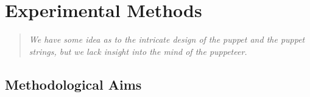 \documentclass[../main.tex]{subfiles}
\begin{document}
\chapter{Experimental Methods}\label{chap:methods}

\bigskip
\begin{quote}
    \emph{We have some idea as to the intricate design of the puppet and the puppet strings, but we lack insight into the mind of the puppeteer\cite{bizziHardScientificQuest2015}.}\\
\end{quote}

\cleardoublepage%


\section{Methodological Aims}\label{methods_aims}
\end{document}
